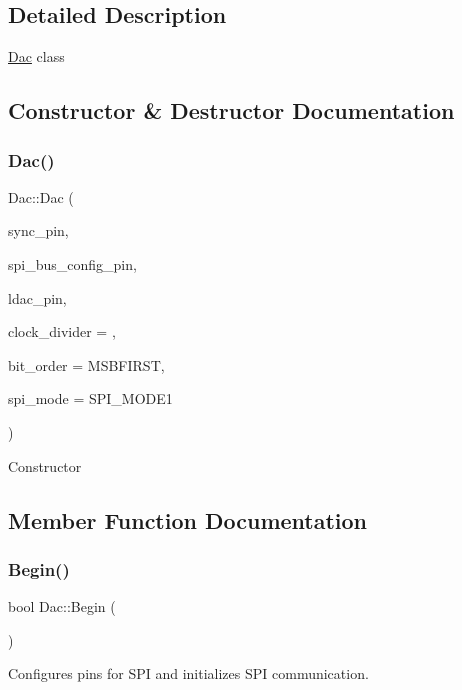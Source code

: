 \subsection{Detailed Description}
\mbox{\hyperlink{classDac}{Dac}} class 

\subsection{Constructor \& Destructor Documentation}
\mbox{\label{classDac_ae74afbc4c82a8acbd8c74dcf4ea046ba}} 
\subsubsection{\texorpdfstring{Dac()}{Dac()}}
{\footnotesize\ttfamily Dac\+::\+Dac (\begin{DoxyParamCaption}\item[{uint8\+\_\+t}]{sync\+\_\+pin,  }\item[{uint8\+\_\+t}]{spi\+\_\+bus\+\_\+config\+\_\+pin,  }\item[{uint8\+\_\+t}]{ldac\+\_\+pin,  }\item[{uint8\+\_\+t}]{clock\+\_\+divider = {},  }\item[{Bit\+Order}]{bit\+\_\+order = {\ttfamily MSBFIRST},  }\item[{uint8\+\_\+t}]{spi\+\_\+mode = {\ttfamily SPI\+\_\+MODE1} }\end{DoxyParamCaption})}

Constructor 

\subsection{Member Function Documentation}
\mbox{\label{classDac_ad88e0048e59c0633b72769ddb8337e49}} 
\subsubsection{\texorpdfstring{Begin()}{Begin()}}
{\footnotesize\ttfamily bool Dac\+::\+Begin (\begin{DoxyParamCaption}\item[{void}]{ }\end{DoxyParamCaption})}

Configures pins for S\+PI and initializes S\+PI communication. \mbox{\label{classDac_a506a65776c631fb3abc6609e58046655}} 
